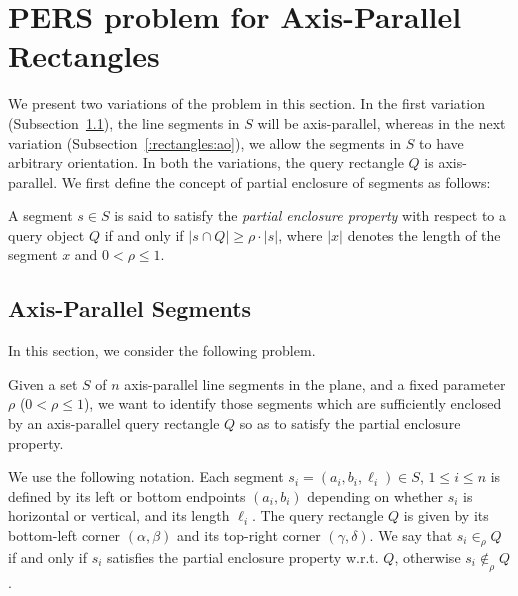 \section{PERS problem for Axis-Parallel Rectangles}
\label{:rectangles}


We present two variations of the \PERS{} problem in this section. 
In the first variation (Subsection~\ref{:rectangles:ap}), the line 
segments in $S$ will  be axis-parallel, whereas in the next variation 
(Subsection~\ref{:rectangles:ao}), we allow the segments in $S$ to have 
arbitrary orientation. In both the variations, the query rectangle $Q$ 
is axis-parallel. We first define the concept of partial enclosure of 
segments as follows:


\begin{definition}
A segment $s \in S$ is said to satisfy the {\em partial enclosure 
property} with respect to a query object $Q$ if and only if 
$|s \cap Q| \geq \rho \cdot |s|$, where $|x|$ denotes the length 
of the segment $x$ and $0 < \rho\leq 1$.
\end{definition}


\subsection{Axis-Parallel Segments}
\label{:rectangles:ap}
In this section, we consider the following problem. 


\begin{problem}
Given a set $S$ of $n$ axis-parallel line segments in the plane, 
and a fixed parameter $\rho$ ($0 < \rho \leq 1$), we want to 
identify those segments which are sufficiently enclosed by 
an axis-parallel query rectangle $Q$ so as to satisfy the 
partial enclosure property. 
\end{problem}

We use the following notation. Each segment 
$s_i =(a_i, b_i, \ell_i) \in S$, $1 \leq i \leq n$ is defined 
by its left or bottom endpoints $(a_i, b_i)$ depending on whether 
$s_i$ is horizontal or vertical, and its length $\ell_i$. 
The query rectangle $Q$ is given by its bottom-left corner $(\alpha, 
\beta)$ and its top-right corner $(\gamma, \delta)$.  We say that $s_i \in_\rho Q$ if and only 
if $s_i$ satisfies the partial enclosure property w.r.t. $Q$, 
otherwise $s_i \not \in_\rho Q$. 



